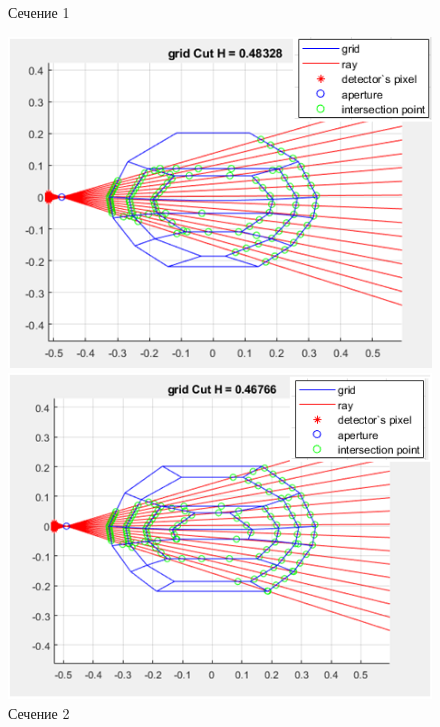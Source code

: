\documentclass[a4]{article}
\begin{document}
\begin{figure}[H]
\begin{center}
\caption{Сечение 1}
\includegraphics{pic6.png} 

\caption{Сечение 2}
\includegraphics{pic7.png} 
\end{center}
\end{figure}
\end{document}
